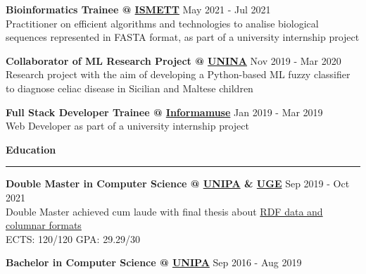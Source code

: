 \documentclass[11pt,letterpaper]{article}
\begin{document}
\begin{justify}
\begin{itemize}[label={}, leftmargin=0pt]
\begin{item}
		      \textbf{Bioinformatics Trainee @ \href{https://www.ismett.edu/en/}{ISMETT}}
		      \hfill
		      May 2021 - Jul 2021
		      \vspace{0.05cm}
		      \\
		      Practitioner on efficient algorithms and technologies to analise biological sequences represented in FASTA format, as part of a university internship project
		\end{item}
		\begin{item}
		      \textbf{Collaborator of ML Research Project @ \href{https://www.unina.it/en_GB}{UNINA}}
		      \hfill
		      Nov 2019 - Mar 2020
		      \vspace{0.05cm}
		      \\
		      Research project with the aim of developing a Python-based ML fuzzy classifier to diagnose celiac disease in Sicilian and Maltese children
		\end{item}
		\begin{item}
		      \textbf{Full Stack Developer Trainee @ \href{https://www.informamuse.com/en/home/}{Informamuse}}
		      \hfill
		      Jan 2019 - Mar 2019
		      \vspace{0.05cm}
		      \\
		      Web Developer as part of a university internship project
		\end{item}
	\end{itemize}
	\vspace{0.1cm}
	{\large \textbf{Education} \strut}
	\hrule
	\begin{itemize}[label={}, leftmargin=0pt]
		\begin{item}
		      \textbf{Double Master in Computer Science @ \href{https://www.unipa.it/mobilita/en/}{UNIPA} \& \href{https://www.univ-gustave-eiffel.fr/en/}{UGE}}
		      \hfill
		      Sep 2019 - Oct 2021
		      \vspace{0.05cm}
		      \\
		      Double Master achieved cum laude with final thesis about \href{https://raw.githubusercontent.com/dariocurr/thesis/main/thesis.pdf}{RDF data and columnar formats}
		      \\
		      ECTS: 120/120 \hspace{0.33cm} GPA: 29.29/30
		\end{item}
		\begin{item}
		      \textbf{Bachelor in Computer Science @ \href{https://www.unipa.it/mobilita/en/}{UNIPA}}
		      \hfill
		      Sep 2016 - Aug 2019
		      \vspace{0.05cm}

\end{item}
\end{itemize}
\end{justify}
\end{document}
